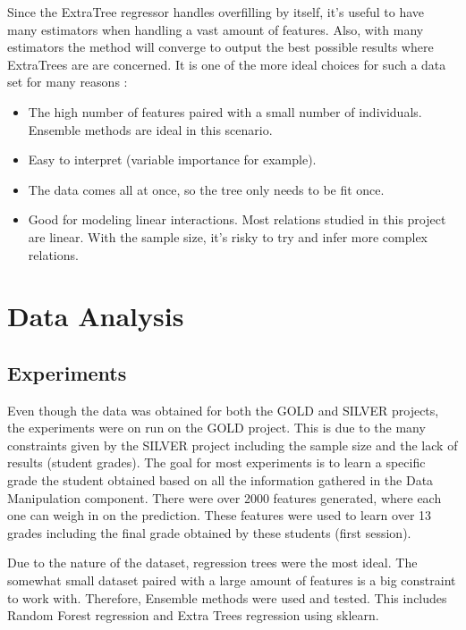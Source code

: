 \documentclass[a4paper,11pt]{report}
\numberwithin{figure}{section} %
\begin{document}
    Since the ExtraTree regressor handles overfilling by itself, it's useful to have many estimators when handling a vast amount of features.
    Also, with many estimators the method will converge to output the best possible results where ExtraTrees are are concerned.
    It is one of the more ideal choices for such a data set for many reasons :
    \begin{itemize}
        \item[\textbullet] The high number of features paired with a small number of individuals.
        Ensemble methods are ideal in this scenario.
        \item[\textbullet] Easy to interpret (variable importance for example).
        \item[\textbullet] The data comes all at once, so the tree only needs to be fit once.
        \item[\textbullet] Good for modeling linear interactions.
        Most relations studied in this project are linear.
        With the sample size, it's risky to try and infer more complex relations.
    \end{itemize}

\section{Data Analysis}

	\subsection{Experiments}
    
    
    Even though the data was obtained for both the GOLD and SILVER projects, the experiments were on run on the GOLD project.
    This is due to the many constraints given by the SILVER project including the sample size and the lack of results (student grades).
    The goal for most experiments is to learn a specific grade the student obtained based on all the information gathered in the Data Manipulation component.
    There were over 2000 features generated, where each one can weigh in on the prediction.
    These features were used to learn over 13 grades including the final grade obtained by these students (first session).\newline
    
    
    Due to the nature of the dataset, regression trees were the most ideal.
    The somewhat small dataset paired with a large amount of features is a big constraint to work with.
    Therefore, Ensemble methods were used and tested.
    This includes Random Forest regression and Extra Trees regression using sklearn.\newline
    
\end{document}
